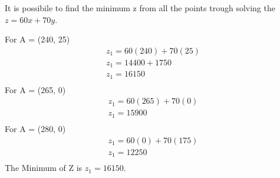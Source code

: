 \documentclass[unicode,11pt,a4paper,oneside,numbers=endperiod,openany]{scrartcl}
\begin{document}
It is possibile to find the minimum z from all the points trough solving the $z = 60x + 70y$.
\newline

For A = (240, 25) \newline
\begin{equation*}
		\begin{aligned}
 z_1 = 60 (240) + 70 (25) \\
 z_1 = 14400 + 1750 \\
  z_1 = 16150\\
 		\end{aligned}
\end{equation*}
\newline
For A = (265, 0)
\newline
\begin{equation*}
		\begin{aligned}
 z_1 = 60 (265) + 70 (0) \\
 z_1 =  15900 \\
 		\end{aligned}
\end{equation*}
\newline
For A = (280, 0)
\newline
\begin{equation*}
		\begin{aligned}
 z_1 = 60 (0) + 70 (175) \\
 z_1 =  12250 \\
		\end{aligned}
\end{equation*}
\newline
The Minimum of Z is \textbf{$z_1 = 16150$}.
\newline\newline
\end{document}
